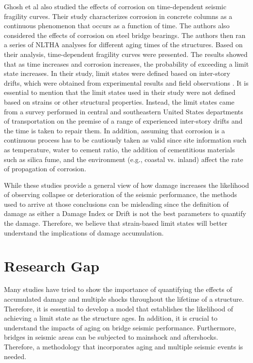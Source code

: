 Ghosh et al \cite{Ghosh2010} also studied the effects of corrosion on time-dependent seismic fragility curves. Their study characterizes corrosion in concrete columns as a continuous phenomenon that occurs as a function of time. The authors also considered the effects of corrosion on steel bridge bearings. The authors then ran a series of NLTHA analyses for different aging times of the structures. Based on their analysis, time-dependent fragility curves were presented. The results showed that as time increases and corrosion increases, the probability of exceeding a limit state increases. In their study, limit states were defined based on inter-story drifts, which were obtained from experimental results and field observations \cite{Padgett2007}. It is essential to mention that the limit states used in their study were not defined based on strains or other structural properties. Instead, the limit states came from a survey performed in central and southeastern United States departments of transportation on the premise of a range of experienced inter-story drifts and the time is taken to repair them. In addition, assuming that corrosion is a continuous process has to be cautiously taken as valid since site information such as temperature, water to cement ratio, the addition of cementitious materials such as silica fume, and the environment (e.g., coastal vs. inland) affect the rate of propagation of corrosion\cite{Thoft-Christensen}.

While these studies provide a general view of how damage increases the likelihood of observing collapse or deterioration of the seismic performance, the methods used to arrive at those conclusions can be misleading since the definition of damage as either a Damage Index or Drift is not the best parameters to quantify the damage. Therefore, we believe that strain-based limit states will better understand the implications of damage accumulation.

\section{Research Gap}

Many studies have tried to show the importance of quantifying the effects of accumulated damage and multiple shocks throughout the lifetime of a structure. Therefore, it is essential to develop a model that establishes the likelihood of achieving a limit state as the structure ages. In addition,  it is crucial to understand the impacts of aging on bridge seismic performance. Furthermore, bridges in seismic areas can be subjected to mainshock and aftershocks. Therefore, a methodology that incorporates aging and multiple seismic events is needed.

